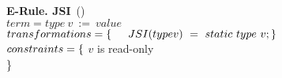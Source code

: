 \textbf{E-Rule. JSI}~(\mujava{})\\
$term = type~v~:=~value$\\
$transformations = \{\\ \indent JSI(type v)~=~static~type~v; \\\}$\\
$constraints = \{ \\$ 
\indent $v$ is read-only\\  \}\\

